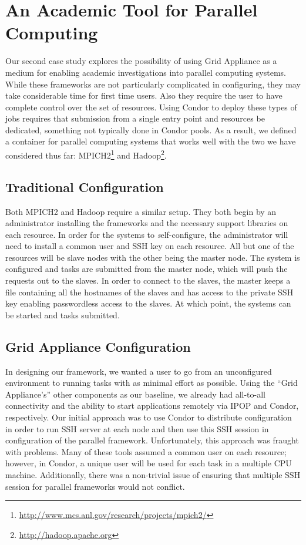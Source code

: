 \documentclass[twocolumn]{svjour3}
\begin{document}
\section{An Academic Tool for Parallel Computing}

Our second case study explores the possibility of using Grid Appliance as a
medium for enabling academic investigations into parallel computing systems.
While these frameworks are not particularly complicated in configuring, they
may take considerable time for first time users.  Also they require the user to
have complete control over the set of resources.  Using Condor to deploy these
types of jobs requires that submission from a single entry point and resources
be dedicated, something not typically done in Condor pools.  As a result, we
defined a container for parallel computing systems that works well with the two
we have considered thus far:
MPICH2\footnote{\url{http://www.mcs.anl.gov/research/projects/mpich2/}} and
Hadoop\footnote{\url{http://hadoop.apache.org}}.

\subsection{Traditional Configuration}

Both MPICH2 and Hadoop require a similar setup.  They both begin by an
administrator installing the frameworks and the necessary support libraries on
each resource.  In order for the systems to {\emph self-configure}, the
administrator will need to install a common user and SSH key on each resource.
All but one of the resources will be slave nodes with the other being the
master node.  The system is configured and tasks are submitted from the master
node, which will push the requests out to the slaves.  In order to connect to
the slaves, the master keeps a file containing all the hostnames of the slaves
and has access to the private SSH key enabling passwordless access to the
slaves.  At which point, the systems can be started and tasks submitted.

\subsection{Grid Appliance Configuration}

In designing our framework, we wanted a user to go from an unconfigured
environment to running tasks with as minimal effort as possible.  Using the
``Grid Appliance's'' other components as our baseline, we already had
all-to-all connectivity and the ability to start applications remotely via IPOP
and Condor, respectively.  Our initial approach was to use Condor to distribute
configuration in order to run SSH server at each node and then use this SSH
session in configuration of the parallel framework.  Unfortunately, this
approach was fraught with problems.  Many of these tools assumed a common user
on each resource; however, in Condor, a unique user will be used for each task
in a multiple CPU machine.  Additionally, there was a non-trivial issue of
ensuring that multiple SSH session for parallel frameworks would not conflict.
\end{document}

